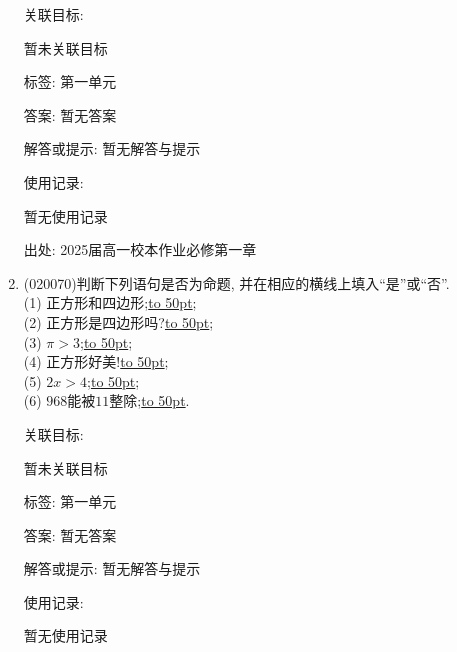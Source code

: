 \documentclass[10pt,a4paper]{article}
\newcommand{\blank}[1]{\underline{\hbox to #1pt{}}}
\begin{document}
\begin{enumerate}[1.]
关联目标:

暂未关联目标



标签: 第一单元

答案: 暂无答案

解答或提示: 暂无解答与提示

使用记录:

暂无使用记录


出处: 2025届高一校本作业必修第一章
\item { (020070)}判断下列语句是否为命题, 并在相应的横线上填入``是''或``否''.\\
(1) 正方形和四边形;\blank{50};\\
(2) 正方形是四边形吗?\blank{50};\\
(3) $\pi>3$;\blank{50};\\
(4) 正方形好美!\blank{50};\\
(5) $2x>4$;\blank{50};\\
(6) $968$能被$11$整除;\blank{50}.


关联目标:

暂未关联目标



标签: 第一单元

答案: 暂无答案

解答或提示: 暂无解答与提示

使用记录:

暂无使用记录



\end{enumerate}
\end{document}
